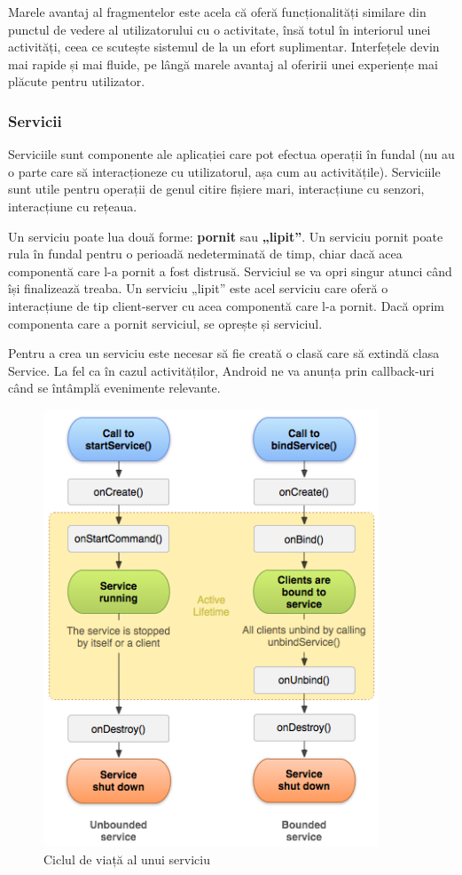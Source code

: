 \documentclass[12pt,a4paper]{article}
\begin{document}
Marele avantaj al fragmentelor este acela că oferă funcționalități similare din punctul de vedere al utilizatorului cu o activitate, însă totul în interiorul unei activități, ceea ce scutește sistemul de la un efort suplimentar. Interfețele devin mai rapide și mai fluide, pe lângă marele avantaj al oferirii unei experiențe mai plăcute pentru utilizator.

\subsubsection{Servicii}
Serviciile sunt componente ale aplicației care pot efectua operații în fundal (nu au o parte care să interacționeze cu utilizatorul, așa cum au activitățile). Serviciile sunt utile pentru operații de genul citire fișiere mari, interacțiune cu senzori, interacțiune cu rețeaua.

Un serviciu poate lua două forme: \textbf{pornit} sau \textbf{„lipit”}. Un serviciu pornit poate rula în fundal pentru o perioadă nedeterminată de timp, chiar dacă acea componentă care l-a pornit a fost distrusă. Serviciul se va opri singur atunci când își finalizează treaba. Un serviciu „lipit” este acel serviciu care oferă o interacțiune de tip client-server cu acea componentă care l-a pornit. Dacă oprim componenta care a pornit serviciul, se oprește și serviciul.

Pentru a crea un serviciu este necesar să fie creată o clasă care să extindă clasa Service. La fel ca în cazul activităților, Android ne va anunța prin callback-uri când se întâmplă evenimente relevante.

\begin{figure}[h]
\centering
\includegraphics[width=10cm]{figures/service_lifecycle.png}
\caption{Ciclul de viață al unui serviciu}
\end{figure}
\end{document}
